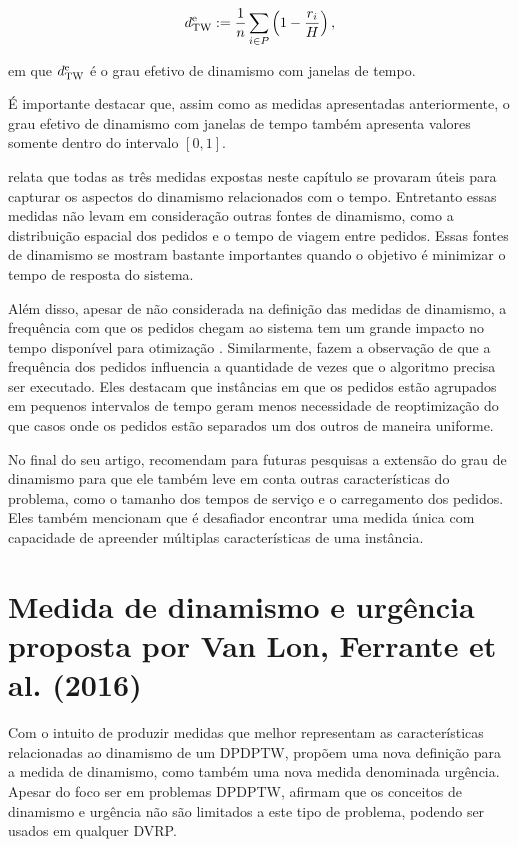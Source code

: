 \begin{equation}
  d^\text{e}_\text{TW} := 
  \frac{1}{n}
  \sum_{i \in P}
  {
    \left(
      1 - \frac{r_i}{H}
    \right),
  }
\end{equation}

\noindent em que $d^\text{e}_\text{TW}$ é o grau efetivo de dinamismo com 
janelas de tempo.

É importante destacar que, assim como as medidas apresentadas anteriormente, o
grau efetivo de dinamismo com janelas de tempo também apresenta valores somente
dentro do intervalo $[0, 1]$.

 relata que todas as três medidas expostas neste
capítulo se provaram úteis para capturar os aspectos do dinamismo relacionados
com o tempo.
Entretanto essas medidas não levam em consideração outras fontes de dinamismo,
como a distribuição espacial dos pedidos e o tempo de viagem entre pedidos.
Essas fontes de dinamismo se mostram bastante importantes quando o objetivo é
minimizar o tempo de resposta do sistema.

Além disso, apesar de não considerada na definição das medidas de dinamismo, a
frequência com que os pedidos chegam ao sistema tem um grande impacto no tempo
disponível para otimização \cite{pillac_review_2013}.
Similarmente,  fazem a observação de que a
frequência dos pedidos influencia a quantidade de vezes que o algoritmo
precisa ser executado.
Eles destacam que instâncias em que os pedidos estão agrupados em
pequenos intervalos de tempo geram menos necessidade de reoptimização do que
casos onde os pedidos estão separados um dos outros de maneira uniforme.

No final do seu artigo,  recomendam
para futuras pesquisas a extensão do grau de dinamismo para que ele também 
leve em conta outras características do problema, como o tamanho dos tempos de 
serviço e o carregamento dos pedidos.
Eles também mencionam que é desafiador encontrar uma medida única com
capacidade de apreender múltiplas características de uma instância.






\section{Medida de dinamismo e urgência proposta por Van Lon, Ferrante et al.
         (2016)}\label{sec:medidas_van_lon}
Com o intuito de produzir medidas que melhor representam as características
relacionadas ao dinamismo de um DPDPTW,  
propõem uma nova definição para a medida de dinamismo, como também uma nova
medida denominada urgência.
Apesar do foco ser em problemas DPDPTW, 
afirmam que os conceitos de dinamismo e urgência não são limitados a este tipo
de problema, podendo ser usados em qualquer DVRP.

